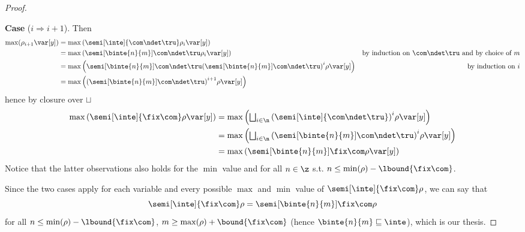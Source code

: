 \begin{proof}
\begin{enumerate}[label=(\roman*)]
    \noindent
    \textbf{Case} (\(i \Rightarrow i+1\)).  Then
    \begin{align*}
      \max(\rho_{i+1}\var[y]) & = \max\left(\semi[\inte]{\com\ndet\tru}\rho_i\var[y]\right) \\
                              & = \max\left(\semi[\binte{n}{m}]{\com\ndet\tru}\rho_i\var[y]\right) & \text{by induction on } \com \ndet \tru \text{ and by choice of } m \\
                              & = \max\left(\semi[\binte{n}{m}]{\com\ndet\tru}{\left(\semi[\binte{n}{m}]{\com\ndet\tru}\right)}^i\rho\var[y]\right) & \text{by induction on } i \\
                 & = \max\left({\left(\semi[\binte{n}{m}]{\com\ndet\tru}\right)}^{i+1}\rho\var[y]\right)
    \end{align*}
    hence by closure over \(\sqcup\)
    \begin{align*}
      \max\left(\semi[\inte]{\fix\com}\rho\var[y]\right)
      & =
        \max\left(\textstyle\bigsqcup_{i\in\n}{\left(\semi[\inte]{\com\ndet\tru}\right)}^i\rho\var[y]\right) \\
      & =
        \max\left(\textstyle\bigsqcup_{i\in\n}{\left(\semi[\binte{n}{m}]{\com\ndet\tru}\right)}^i\rho\var[y]\right) \\
      & =
        \max\left(\semi[\binte{n}{m}]{\fix\com}\rho\var[y]\right)
    \end{align*}
    Notice that the latter observations also holds for the \(\min\)
    value and for all \(n \in \z\) s.t.
    \({n \leq \min(\rho) - \lbound{\fix\com}}\).
  \end{enumerate}
  Since the two cases apply for each variable and every possible
  \(\max\) and \(\min\) value of \(\semi[\inte]{\fix\com}\rho\), we
  can say that
  \begin{equation*}
    \semi[\inte]{\fix\com}\rho = \semi[\binte{n}{m}]{\fix\com}\rho
  \end{equation*}
  for all \(n \leq \min(\rho) - \lbound{\fix\com}\),
  \(m \geq \max(\rho) + \bound{\fix\com}\) (hence
  \(\binte{n}{m} \sqsubseteq \inte\)), which is our thesis.
\end{proof}
